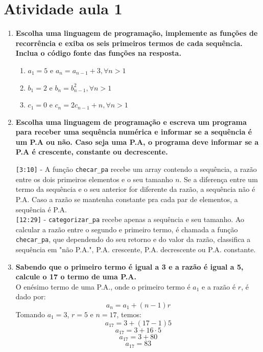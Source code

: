 \section*{Atividade aula 1}

\begin{enumerate}
	\item \textbf{Escolha uma linguagem de programação, implemente as funções de recorrência e exiba os seis primeiros termos de cada sequência. Inclua o código fonte das funções na resposta.}
	\begin{enumerate}
		\item $a_1 = 5$ e $a_n = a_{n-1}+3, \forall n > 1$
		

		\item $b_1 = 2$ e $b_n = b_{n-1}^2, \forall n > 1$
		

		\item $c_1 = 0$ e $c_n = 2c_{n-1}+n, \forall n > 1$
		
	\end{enumerate}

	\item \textbf{Escolha uma linguagem de programação e escreva um programa para receber uma sequência numérica e informar se a sequência é um P.A ou não. Caso seja uma P.A, o programa deve informar se a P.A é crescente, constante ou decrescente.}
	
	\verb|[3:10]| - A função \verb|checar_pa| recebe um array contendo a sequência, a razão entre os dois primeiros elementos e o seu tamanho $n$. Se a diferença entre um termo da sequência e o seu anterior for diferente da razão, a sequência não é P.A. Caso a razão se mantenha constante pra cada par de elementos, a sequência é P.A. \\
	\verb|[12:29]| - \verb|categorizar_pa| recebe apenas a sequência e seu tamanho. Ao calcular a razão entre o segundo e primeiro termo, é chamada a função \verb|checar_pa|, que dependendo do seu retorno e do valor da razão, classifica a sequência em "não P.A.", P.A. crescente, P.A. decrescente ou P.A. constante.
	
	\item \textbf{Sabendo que o primeiro termo é igual a 3 e a razão é igual a 5, calcule o 17 o termo de uma P.A.}\\
	O enésimo termo de uma P.A., onde o primeiro termo é $a_1$ e a razão é $r$, é dado por:
	$$ a_n = a_1 + (n-1)r $$
	Tomando $a_1 = 3$, $r=5$ e $n=17$, temos:
	$$ a_{17} = 3 + (17-1)5 $$
	$$ a_{17} = 3 + 16 \cdot 5 $$
	$$ a_{17} = 3 + 80 $$
	$$ a_{17} = 83 $$
	

\end{enumerate}
